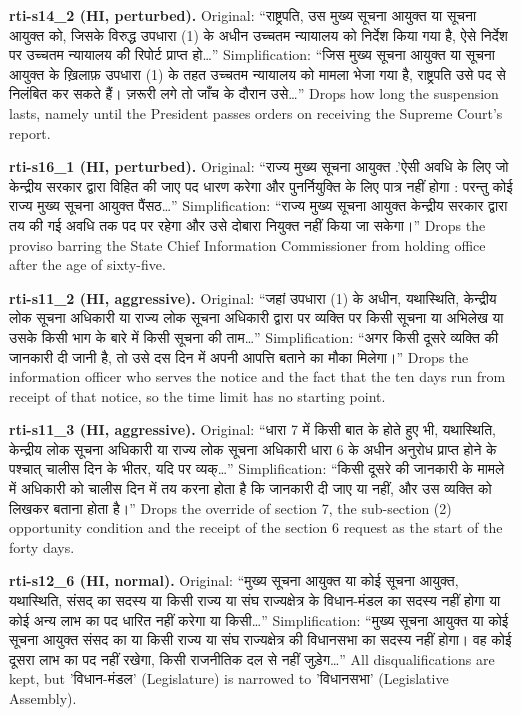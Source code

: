 \documentclass[conference]{IEEEtran}
\newcommand{\dev}[1]{{\devfont #1}}
\begin{document}
{\noindent\textbf{rti-s14\_2 (HI, perturbed).} Original: “\dev{राष्ट्रपति, उस मुख्य सूचना आयुक्त या सूचना आयुक्त को, जिसके विरुद्ध उपधारा (1) के अधीन उच्चतम न्यायालय को निर्देश किया गया है, ऐसे निर्देश पर उच्चतम न्यायालय की रिपोर्ट प्राप्त हो}…”  Simplification: “\dev{जिस मुख्य सूचना आयुक्त या सूचना आयुक्त के ख़िलाफ़ उपधारा (1) के तहत उच्चतम न्यायालय को मामला भेजा गया है, राष्ट्रपति उसे पद से निलंबित कर सकते हैं। ज़रूरी लगे तो जाँच के दौरान उसे}…”  Drops how long the suspension lasts, namely until the President passes orders on receiving the Supreme Court's report.

\noindent\textbf{rti-s16\_1 (HI, perturbed).} Original: “\dev{राज्य मुख्य सूचना आयुक्त .'ऐसी अवधि के लिए जो केन्द्रीय सरकार द्वारा विहित की जाए पद धारण करेगा और पुनर्नियुक्ति के लिए पात्र नहीं होगा : परन्तु कोई राज्य मुख्य सूचना आयुक्त पैंसठ}…”  Simplification: “\dev{राज्य मुख्य सूचना आयुक्त केन्द्रीय सरकार द्वारा तय की गई अवधि तक पद पर रहेगा और उसे दोबारा नियुक्त नहीं किया जा सकेगा।}”  Drops the proviso barring the State Chief Information Commissioner from holding office after the age of sixty-five.

\noindent\textbf{rti-s11\_2 (HI, aggressive).} Original: “\dev{जहां उपधारा (1) के अधीन, यथास्थिति, केन्द्रीय लोक सूचना अधिकारी या राज्य लोक सूचना अधिकारी द्वारा पर व्यक्ति पर किसी सूचना या अभिलेख या उसके किसी भाग के बारे में किसी सूचना की ताम}…”  Simplification: “\dev{अगर किसी दूसरे व्यक्ति की जानकारी दी जानी है, तो उसे दस दिन में अपनी आपत्ति बताने का मौका मिलेगा।}”  Drops the information officer who serves the notice and the fact that the ten days run from receipt of that notice, so the time limit has no starting point.

\noindent\textbf{rti-s11\_3 (HI, aggressive).} Original: “\dev{धारा 7 में किसी बात के होते हुए भी, यथास्थिति, केन्द्रीय लोक सूचना अधिकारी या राज्य लोक सूचना अधिकारी धारा 6 के अधीन अनुरोध प्राप्त होने के पश्चात् चालीस दिन के भीतर, यदि पर व्यक्}…”  Simplification: “\dev{किसी दूसरे की जानकारी के मामले में अधिकारी को चालीस दिन में तय करना होता है कि जानकारी दी जाए या नहीं, और उस व्यक्ति को लिखकर बताना होता है।}”  Drops the override of section 7, the sub-section (2) opportunity condition and the receipt of the section 6 request as the start of the forty days.

\noindent\textbf{rti-s12\_6 (HI, normal).} Original: “\dev{मुख्य सूचना आयुक्त या कोई सूचना आयुक्त, यथास्थिति, संसद् का सदस्य या किसी राज्य या संघ राज्यक्षेत्र के विधान-मंडल का सदस्य नहीं होगा या कोई अन्य लाभ का पद धारित नहीं करेगा या किसी}…”  Simplification: “\dev{मुख्य सूचना आयुक्त या कोई सूचना आयुक्त संसद का या किसी राज्य या संघ राज्यक्षेत्र की विधानसभा का सदस्य नहीं होगा। वह कोई दूसरा लाभ का पद नहीं रखेगा, किसी राजनीतिक दल से नहीं जुड़ेग}…”  All disqualifications are kept, but '\dev{विधान-मंडल}' (Legislature) is narrowed to '\dev{विधानसभा}' (Legislative Assembly).

}
\end{document}
